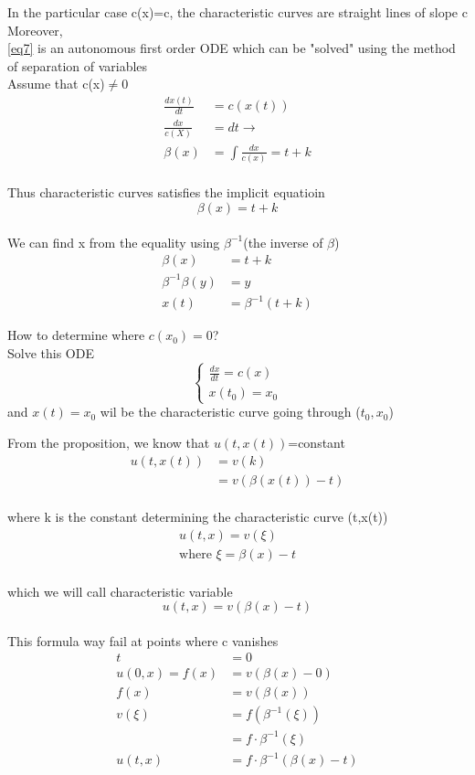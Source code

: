 In the particular case c(x)=c, the characteristic curves are straight lines of slope c
\\Moreover,
\\ \eqref{eq7} is an autonomous first order ODE which can be "solved" using the method of separation of variables
\\Assume that c(x)$ \neq $0 
\begin{align*}
    \frac{dx(t)}{dt}&=c(x(t))
\\\frac{dx}{c(X)}&=dt \rightarrow
\\ \beta (x)&=\int\frac{dx}{c(x)}=t+k
\end{align*}
\\Thus characteristic curves satisfies the implicit equatioin$$\beta(x)=t+k$$
\\We can find x from the equality using $ \beta^{-1} $(the inverse of $ \beta $) 
\begin{align*}
    \beta(x)&=t+k
    \\ \beta^{-1}\beta(y)&=y
    \\x(t)&=\beta^{-1}(t+k)
\end{align*}
\begin{remark}{}{}
How to determine where $c(x_0)=0$?
\\Solve this ODE$$
    \begin{cases}
        \frac{dx}{dt}=c(x)
        \\x(t_0)=x_0
    \end{cases}
$$ 
and $ x(t)=x_0 $ wil be the characteristic curve going through ($t_0,x_0$) 
\end{remark}
From the proposition, we know that $ u(t,x(t)) $=constant
\begin{align*}
    u(t,x(t))&=v(k)
    \\&=v(\beta(x(t))-t)
\end{align*} 
\\where k is the constant determining the characteristic curve (t,x(t))
\begin{align*}
    u(t,x)=v(\xi)
    \\ \text{where    } \xi=\beta(x)-t
\end{align*}
\\which we will call characteristic variable
\begin{equation}
    \label{eq8} u(t,x)=v(\beta(x)-t)
\end{equation}
\\This formula way fail at points where c vanishes
\begin{align*}
    t&=0
    \\u(0,x)=f(x)&=v(\beta(x)-0)
    \\f(x)&=v(\beta(x))
    \\v(\xi)&=f(\beta^{-1}(\xi))
    \\&=f\cdot \beta^{-1}(\xi)
    \\u(t,x)&=f\cdot\beta^{-1}(\beta(x)-t)
\end{align*}
